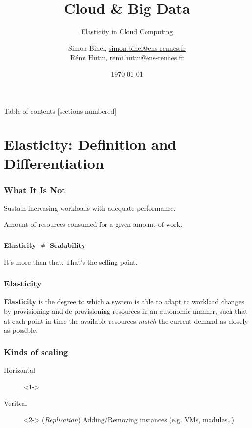 \documentclass{beamer}
\title{Cloud \& Big Data}
\subtitle{Elasticity in Cloud Computing}
\date{\today}
\author{%
  Simon Bihel, \url{simon.bihel@ens-rennes.fr} \\
  Rémi Hutin, \url{remi.hutin@ens-rennes.fr}
}
\institute{%
  University of Rennes I \\
  École normale supérieure de Rennes
}
\begin{document}
\maketitle

\begin{frame}{Table of contents}
  [sections numbered]
  \tableofcontents[hideallsubsections]
\end{frame}


\section{Elasticity: Definition and Differentiation}
\begin{frame}
  \frametitle{What It Is Not~\cite{herbst2013elasticity}}
  \begin{description}
    \parbox{\linewidth}{%
    \item[Scalability] Sustain increasing workloads with adequate performance.
    \item[Efficiency] Amount of resources consumed for a given amount of work.
    }
  \end{description}
\end{frame}


\begin{frame}
  \frametitle{}
  \centering
  \Large\textbf{Elasticity} $\neq$ \textbf{Scalability}

  \pause{}
  It's more than that. That's the selling point.
\end{frame}

\begin{frame}
  \frametitle{Elasticity~\cite{herbst2013elasticity}~\cite{galante2012survey}~\cite{gulati2011cloud}~\cite{sharma2011cost}~\cite{moore2013coordinated}}
  \begin{definition}
  \parbox{\linewidth}{\textbf{Elasticity} is the degree to which a system is able to adapt to workload changes by provisioning and de-provisioning resources in an autonomic manner, such that at each point in time the available resources \textit{match} the current demand as closely as possible.
  }
  \end{definition}
\end{frame}

\begin{frame}
  \frametitle{Kinds of scaling}
  \begin{description}
    \item[Horizontal]<1->
    \item[Veritcal]<2-> (\textit{Replication}) Adding/Removing instances (e.g. VMs, modules\dots)
  \end{description}
\end{frame}
\end{document}

